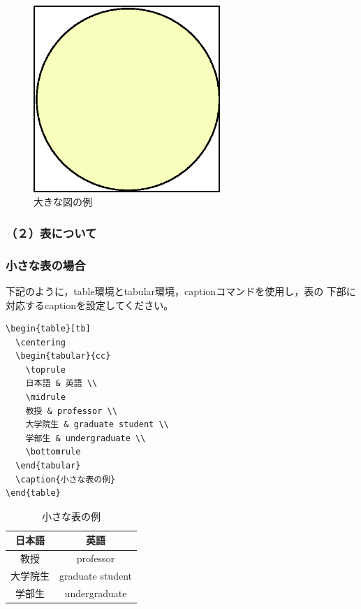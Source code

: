\documentclass[b5paper,10pt,twocolumn,tombow]{jarticle}
\begin{document}
\begin{figure}[tb]
  \centering
  \includegraphics[width=200pt]{test.eps}
  \caption{大きな図の例}
\end{figure}


\subsubsection*{（２）表について}
\subsubsection*{小さな表の場合}
下記のように，table環境とtabular環境，captionコマンドを使用し，表の
下部に対応するcaptionを設定してください。

\begin{verbatim}
\begin{table}[tb]
  \centering
  \begin{tabular}{cc}
    \toprule
    日本語 & 英語 \\
    \midrule
    教授 & professor \\
    大学院生 & graduate student \\
    学部生 & undergraduate \\
    \bottomrule
  \end{tabular}
  \caption{小さな表の例}
\end{table}
\end{verbatim}

\begin{table}[tb]
  \centering
  \begin{tabular}{cc}
    \toprule
    日本語 & 英語 \\
    \midrule
    教授 & professor \\
    大学院生 & graduate student \\
    学部生 & undergraduate \\
    \bottomrule
  \end{tabular}
  \caption{小さな表の例}
\end{table}
\end{document}
